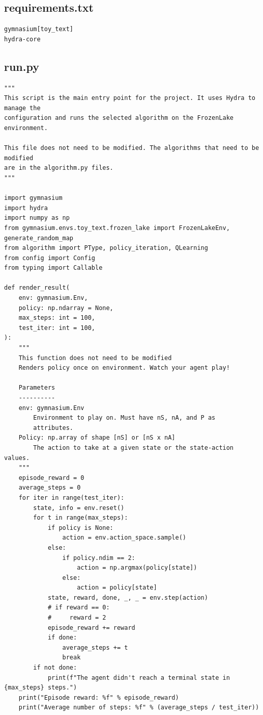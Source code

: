 \documentclass[a4paper,12pt]{article}
\begin{document}
\begin{appendices}

\subsection*{requirements.txt}
\begin{verbatim}
gymnasium[toy_text]
hydra-core
\end{verbatim}

\subsection*{run.py}
\begin{verbatim}
"""
This script is the main entry point for the project. It uses Hydra to manage the 
configuration and runs the selected algorithm on the FrozenLake environment.

This file does not need to be modified. The algorithms that need to be modified 
are in the algorithm.py files.
"""

import gymnasium
import hydra
import numpy as np
from gymnasium.envs.toy_text.frozen_lake import FrozenLakeEnv, generate_random_map
from algorithm import PType, policy_iteration, QLearning
from config import Config
from typing import Callable

def render_result(
    env: gymnasium.Env, 
    policy: np.ndarray = None, 
    max_steps: int = 100,
    test_iter: int = 100,
):
    """
    This function does not need to be modified
    Renders policy once on environment. Watch your agent play!

    Parameters
    ----------
    env: gymnasium.Env
        Environment to play on. Must have nS, nA, and P as
        attributes.
    Policy: np.array of shape [nS] or [nS x nA]
        The action to take at a given state or the state-action values.
    """
    episode_reward = 0
    average_steps = 0
    for iter in range(test_iter):
        state, info = env.reset()
        for t in range(max_steps):
            if policy is None:
                action = env.action_space.sample()
            else:
                if policy.ndim == 2:
                    action = np.argmax(policy[state])
                else:
                    action = policy[state]
            state, reward, done, _, _ = env.step(action)
            # if reward == 0:
            #     reward = 2
            episode_reward += reward
            if done:
                average_steps += t
                break
        if not done:
            print(f"The agent didn't reach a terminal state in {max_steps} steps.")
    print("Episode reward: %f" % episode_reward)
    print("Average number of steps: %f" % (average_steps / test_iter))


\end{verbatim}
\end{appendices}
\end{document}
